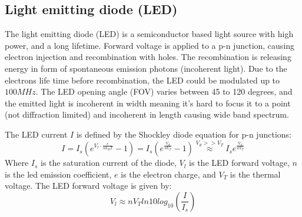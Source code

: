 \documentclass[\main/master.tex]{subfiles}
\begin{document}
\subsection{Light emitting diode (LED)}
The light emitting diode (LED) is a semiconductor based light source with high power, and a long lifetime. Forward voltage is applied to a p-n junction, causing electron injection and recombination with holes. The recombination is releasing energy in form of spontaneous emission photons (incoherent light). Due to the electrons life time before recombination, the LED could be modulated up to $100MHz$. The LED opening angle (FOV) varies between 45 to 120 degrees, and the emitted light is incoherent in width meaning it's hard to focus it to a point (not diffraction limited) and incoherent in length causing wide band spectrum.
\par\noindent
The LED current $I$ is defined by the Shockley diode equation for p-n junctions:
\begin{equation}
I  = I_s (e^{V_l\cdot \frac{e}{n k_B T} }-1) = I_s (e^{\frac{V_d}{n V_T} } -1) \overset{V_d>>V_T}{\approx} I_s e^{\frac{V_d}{n V_T} }   \label{eqn:led current}
\end{equation}
Where $I_s$ is the saturation current of the diode, $V_l$ is the LED forward voltage, $n$ is the led emission coefficient, $e$ is the electron charge, and $V_T$ is the thermal voltage. The LED forward voltage is given by:
\begin{equation}
V_l \approx n V_T ln10 log_{10} (\frac{I}{I_s}) \label{eqn:led voltage}
\end{equation}
\end{document}
